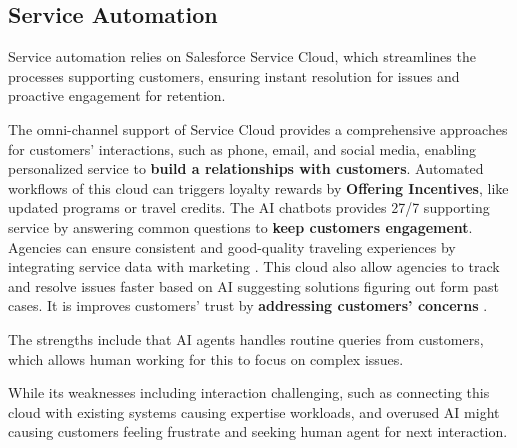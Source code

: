 \subsection{Service Automation}
Service automation relies on Salesforce Service Cloud, which streamlines the processes supporting customers, ensuring instant resolution for issues and proactive engagement for retention.

The omni-channel support of Service Cloud provides a comprehensive approaches for customers' interactions, such as phone, email, and social media, enabling personalized service to \textbf{build a relationships with customers}. Automated workflows of this cloud can triggers loyalty rewards by \textbf{Offering Incentives}, like updated programs or travel credits. The AI chatbots provides 27/7 supporting service by answering common questions to \textbf{keep customers engagement}. Agencies can ensure consistent and good-quality traveling experiences by integrating service data with marketing \cite{SalesforceServiceCloud2025}. This cloud also allow agencies to track and resolve issues faster based on AI suggesting solutions figuring out form past cases. It is improves customers' trust by \textbf{addressing customers' concerns} \cite{SalesforceEinstein2025}. 

The strengths include that AI agents handles routine queries from customers, which allows human working for this to focus on complex issues. 

While its weaknesses including interaction challenging, such as connecting this cloud with existing systems causing expertise workloads, and overused AI might causing customers feeling frustrate and seeking human agent for next interaction. 